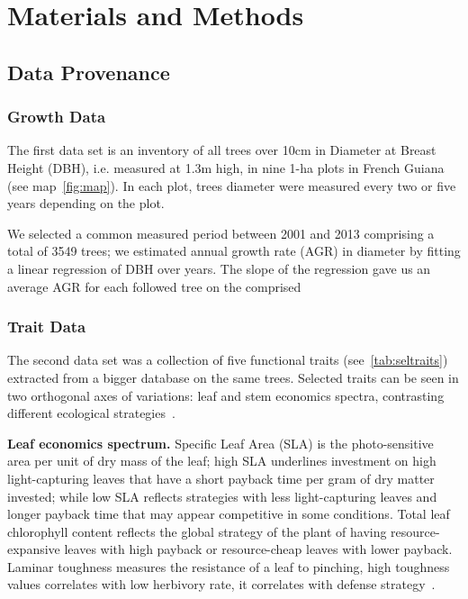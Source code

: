 \section*{Materials and Methods}
\label{sec:M&M}

\subsection*{Data Provenance}

\subsubsection*{Growth Data}
The first data set is an inventory of all trees over 10cm in Diameter at Breast Height (DBH), i.e. measured at 1.3m high, in nine 1-ha plots in French Guiana (see map~\autoref{fig:map}). In each plot, trees diameter were measured every two or five years depending on the plot.

We selected a common measured period between 2001 and 2013 comprising a total of 3549 trees; we estimated annual growth rate (AGR) in diameter by fitting a linear regression of DBH over years. The slope of the regression gave us an average AGR for each followed tree on the comprised 


\subsubsection*{Trait Data}

The second data set was a collection of five functional traits (see~\autoref{tab:seltraits}) extracted from a bigger database \citep{baraloto_decoupled_2010} on the same trees. Selected traits can be seen in two orthogonal axes of variations: leaf and stem economics spectra, contrasting different ecological strategies~\citep{westoby_leaf-height-seed_1998, baraloto_decoupled_2010}.

\textbf{Leaf economics spectrum.} Specific Leaf Area (SLA) is the photo-sensitive area per unit of dry mass of the leaf; high SLA underlines investment on high light-capturing leaves that have a short payback time per gram of dry matter invested; while low SLA reflects strategies with less light-capturing leaves and longer payback time that may appear competitive in some conditions. Total leaf chlorophyll content reflects the global strategy of the plant of having resource-expansive leaves with high payback or resource-cheap leaves with lower payback. Laminar toughness measures the resistance of a leaf to pinching, high toughness values correlates with low herbivory rate, it correlates with defense strategy~\citep{westoby_leaf-height-seed_1998}.

